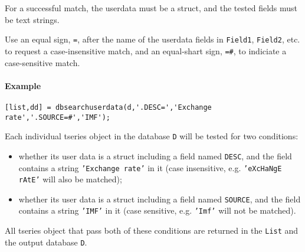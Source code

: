 For a successful match, the userdata must be a struct, and the tested
fields must be text strings.

Use an equal sign, \texttt{=}, after the name of the userdata fields in
\texttt{Field1}, \texttt{Field2}, etc. to request a case-insensitive
match, and an equal-shart sign, \texttt{=\#}, to indiciate a
case-sensitive match.

\paragraph{Example}\label{example}

\begin{verbatim}
[list,dd] = dbsearchuserdata(d,'.DESC=','Exchange rate','.SOURCE=#','IMF');
\end{verbatim}

Each individual tseries object in the database \texttt{D} will be tested
for two conditions:

\begin{itemize}
\item
  whether its user data is a struct including a field named
  \texttt{DESC}, and the field contains a string
  \texttt{'Exchange rate'} in it (case insensitive, e.g.
  \texttt{'eXcHaNgE rAtE'} will also be matched);
\item
  whether its user data is a struct including a field named
  \texttt{SOURCE}, and the field contains a string \texttt{'IMF'} in it
  (case sensitive, e.g. \texttt{'Imf'} will not be matched).
\end{itemize}

All tseries object that pass both of these conditions are returned in
the \texttt{List} and the output database \texttt{D}.


